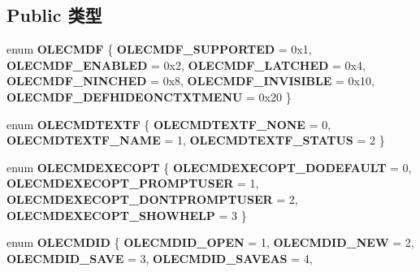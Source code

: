 \subsection*{Public 类型}
\begin{DoxyCompactItemize}
\item 
\mbox{\label{interface_i_ole_command_target_a65b579c2f0c1fe0906956077df076932}} 
enum {\bfseries O\+L\+E\+C\+M\+DF} \{ \newline
{\bfseries O\+L\+E\+C\+M\+D\+F\+\_\+\+S\+U\+P\+P\+O\+R\+T\+ED} = 0x1, 
{\bfseries O\+L\+E\+C\+M\+D\+F\+\_\+\+E\+N\+A\+B\+L\+ED} = 0x2, 
{\bfseries O\+L\+E\+C\+M\+D\+F\+\_\+\+L\+A\+T\+C\+H\+ED} = 0x4, 
{\bfseries O\+L\+E\+C\+M\+D\+F\+\_\+\+N\+I\+N\+C\+H\+ED} = 0x8, 
\newline
{\bfseries O\+L\+E\+C\+M\+D\+F\+\_\+\+I\+N\+V\+I\+S\+I\+B\+LE} = 0x10, 
{\bfseries O\+L\+E\+C\+M\+D\+F\+\_\+\+D\+E\+F\+H\+I\+D\+E\+O\+N\+C\+T\+X\+T\+M\+E\+NU} = 0x20
 \}
\item 
\mbox{\label{interface_i_ole_command_target_ab3c66103b836e47df850c3c5a24f8965}} 
enum {\bfseries O\+L\+E\+C\+M\+D\+T\+E\+X\+TF} \{ {\bfseries O\+L\+E\+C\+M\+D\+T\+E\+X\+T\+F\+\_\+\+N\+O\+NE} = 0, 
{\bfseries O\+L\+E\+C\+M\+D\+T\+E\+X\+T\+F\+\_\+\+N\+A\+ME} = 1, 
{\bfseries O\+L\+E\+C\+M\+D\+T\+E\+X\+T\+F\+\_\+\+S\+T\+A\+T\+US} = 2
 \}
\item 
\mbox{\label{interface_i_ole_command_target_a4fd47ce92815a6edeab4142cc5975350}} 
enum {\bfseries O\+L\+E\+C\+M\+D\+E\+X\+E\+C\+O\+PT} \{ {\bfseries O\+L\+E\+C\+M\+D\+E\+X\+E\+C\+O\+P\+T\+\_\+\+D\+O\+D\+E\+F\+A\+U\+LT} = 0, 
{\bfseries O\+L\+E\+C\+M\+D\+E\+X\+E\+C\+O\+P\+T\+\_\+\+P\+R\+O\+M\+P\+T\+U\+S\+ER} = 1, 
{\bfseries O\+L\+E\+C\+M\+D\+E\+X\+E\+C\+O\+P\+T\+\_\+\+D\+O\+N\+T\+P\+R\+O\+M\+P\+T\+U\+S\+ER} = 2, 
{\bfseries O\+L\+E\+C\+M\+D\+E\+X\+E\+C\+O\+P\+T\+\_\+\+S\+H\+O\+W\+H\+E\+LP} = 3
 \}
\item 
\mbox{\label{interface_i_ole_command_target_a4e208db9dcdddb884238b15d55fb1846}} 
enum {\bfseries O\+L\+E\+C\+M\+D\+ID} \{ \newline
{\bfseries O\+L\+E\+C\+M\+D\+I\+D\+\_\+\+O\+P\+EN} = 1, 
{\bfseries O\+L\+E\+C\+M\+D\+I\+D\+\_\+\+N\+EW} = 2, 
{\bfseries O\+L\+E\+C\+M\+D\+I\+D\+\_\+\+S\+A\+VE} = 3, 
{\bfseries O\+L\+E\+C\+M\+D\+I\+D\+\_\+\+S\+A\+V\+E\+AS} = 4, 

\end{DoxyCompactItemize}
